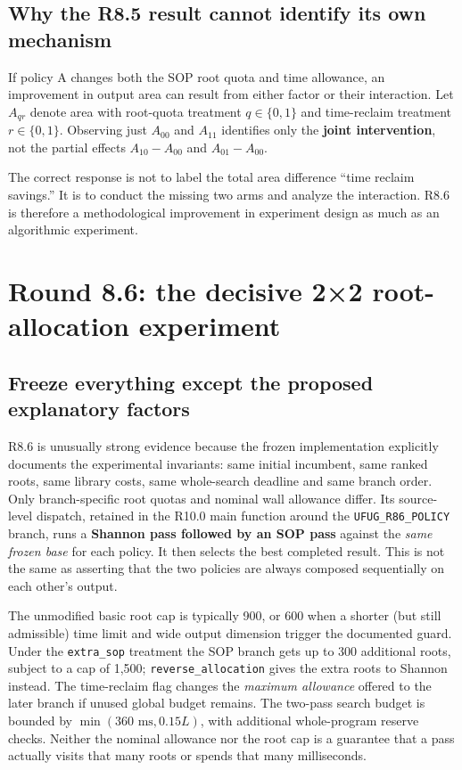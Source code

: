 \subsection{Why the R8.5 result cannot identify its own mechanism}\label{why-the-r8.5-result-cannot-identify-its-own-mechanism}

If policy A changes both the SOP root quota and time allowance, an improvement in output area can result from either factor or their interaction. Let \(A_{qr}\) denote area with root-quota treatment \(q\in\{0,1\}\) and time-reclaim treatment \(r\in\{0,1\}\). Observing just \(A_{00}\) and \(A_{11}\) identifies only the \textbf{joint intervention}, not the partial effects \(A_{10}-A_{00}\) and \(A_{01}-A_{00}\).

The correct response is not to label the total area difference ``time reclaim savings.'' It is to conduct the missing two arms and analyze the interaction. R8.6 is therefore a methodological improvement in experiment design as much as an algorithmic experiment.

\section{Round 8.6: the decisive 2×2 root-allocation experiment}\label{round-8.6-the-decisive-22-root-allocation-experiment}

\subsection{Freeze everything except the proposed explanatory factors}\label{freeze-everything-except-the-proposed-explanatory-factors}

R8.6 is unusually strong evidence because the frozen implementation explicitly documents the experimental invariants: same initial incumbent, same ranked roots, same library costs, same whole-search deadline and same branch order. Only branch-specific root quotas and nominal wall allowance differ. Its source-level dispatch, retained in the R10.0 main function around the \texttt{UFUG\_R86\_POLICY} branch, runs a \textbf{Shannon pass followed by an SOP pass} against the \emph{same frozen base} for each policy. It then selects the best completed result. This is not the same as asserting that the two policies are always composed sequentially on each other's output.

The unmodified basic root cap is typically 900, or 600 when a shorter (but still admissible) time limit and wide output dimension trigger the documented guard. Under the \texttt{extra\_sop} treatment the SOP branch gets up to 300 additional roots, subject to a cap of 1,500; \texttt{reverse\_allocation} gives the extra roots to Shannon instead. The time-reclaim flag changes the \emph{maximum allowance} offered to the later branch if unused global budget remains. The two-pass search budget is bounded by \(\min(360\text{ ms},0.15L)\), with additional whole-program reserve checks. Neither the nominal allowance nor the root cap is a guarantee that a pass actually visits that many roots or spends that many milliseconds.

